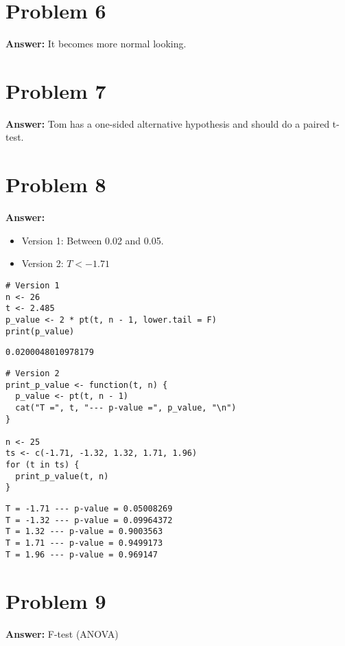 \documentclass[11pt]{article}
\begin{document}
\section*{Problem 6}
\label{sec:orgc89b210}

\textbf{Answer:} It becomes more normal looking.
\section*{Problem 7}
\label{sec:orgaca94c1}

\textbf{Answer:} Tom has a one-sided alternative hypothesis and should do a paired
t-test.
\section*{Problem 8}
\label{sec:org60e9587}

\textbf{Answer:}
\begin{itemize}
\item Version 1: Between 0.02 and 0.05.
\item Version 2: \(T < -1.71\)
\end{itemize}

\begin{verbatim}
# Version 1
n <- 26
t <- 2.485
p_value <- 2 * pt(t, n - 1, lower.tail = F)
print(p_value)
\end{verbatim}

\label{}
\begin{verbatim}
0.0200048010978179
\end{verbatim}


\begin{verbatim}
# Version 2
print_p_value <- function(t, n) {
  p_value <- pt(t, n - 1)
  cat("T =", t, "--- p-value =", p_value, "\n")
}

n <- 25
ts <- c(-1.71, -1.32, 1.32, 1.71, 1.96)
for (t in ts) {
  print_p_value(t, n)
}
\end{verbatim}

\label{}
\begin{verbatim}
T = -1.71 --- p-value = 0.05008269 
T = -1.32 --- p-value = 0.09964372 
T = 1.32 --- p-value = 0.9003563 
T = 1.71 --- p-value = 0.9499173 
T = 1.96 --- p-value = 0.969147 
\end{verbatim}
\section*{Problem 9}
\label{sec:org0811dfa}

\textbf{Answer:} F-test (ANOVA)
\end{document}

